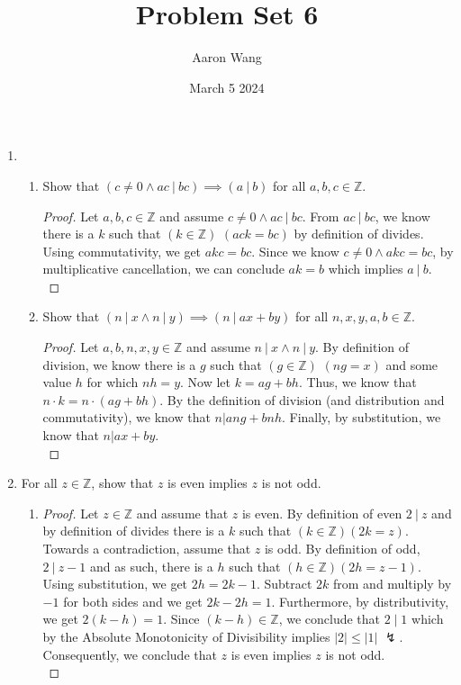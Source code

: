 \documentclass{article}
\title{Problem Set 6}
\author{Aaron Wang}
\date{March 5 2024}
\newcommand{\divides}{\:\mathbb{|}\: }
\newcommand{\integers}{\mathbb{Z}}
\begin{document}
\maketitle

\begin{enumerate}
    \item
    \begin{enumerate}
      \item Show that $(c \neq 0 \land ac \divides bc) \implies (a \divides b)$ for all $a, b, c \in \integers$.
        \begin{proof}
        Let $a,b,c\in \integers$ and assume $c \neq 0 \land ac \divides bc$. From $ac \divides bc$, we know there is a $k$ such that $(k \in \integers)$ $(ack=bc)$ by definition of divides. Using commutativity, we get $akc=bc$. Since we know $c \neq 0 \land akc=bc$, by multiplicative cancellation, we can conclude $ak=b$ which implies $a \divides b$.\\
        \end{proof}
      \item Show that $(n \divides x \land n \divides y) \implies (n \divides ax + by)$ for all $n, x, y, a, b \in \integers$.
        \begin{proof}
        Let $a,b,n,x,y \in \integers$ and assume $n \divides x \land n \divides y$. By definition of division, we know there is a $g$ such that $(g \in \integers)$ $(ng=x)$ and some value $h$ for which $nh=y$. Now let $k=ag+bh$. Thus, we know that $n \cdot k = n \cdot (ag+bh)$. By the definition of division (and distribution and commutativity), we know that $n|ang+bnh$. Finally, by substitution, we know that $n|ax+by$.\\
        \end{proof}
    \end{enumerate}
    \item For all $z \in \integers$, show that $z$ is even implies $z$ is not odd.
    \begin{enumerate}
        \item []
        \begin{proof}
        Let $z \in \integers$ and assume that $z$ is even. By definition of even $2 \divides z$ and by definition of divides there is a $k$ such that $(k \in \integers)(2k=z)$. Towards a contradiction, assume that $z$ is odd. By definition of odd, $2 \divides z-1$ and as such, there is a $h$ such that $(h \in \integers)(2h=z-1)$. Using substitution, we get $2h=2k-1$. Subtract $2k$ from and multiply by $-1$ for both sides and we get $2k-2h=1$. Furthermore, by distributivity, we get $2(k-h)=1$. Since $(k-h) \in \integers$, we conclude that $2 \mid 1$ which by the Absolute Monotonicity of Divisibility implies $|2|\leq|1|$ $\lightning$. Consequently, we conclude that $z$ is even implies $z$ is not odd.\\
    \end{proof}
    \end{enumerate}
    

\end{enumerate}
\end{document}
